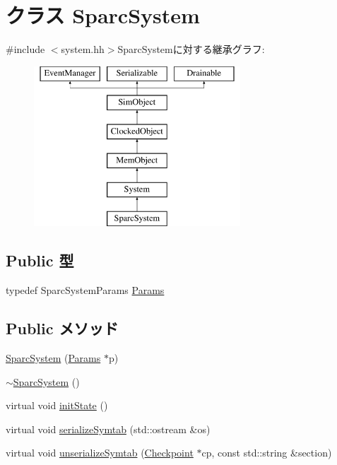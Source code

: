 \hypertarget{classSparcSystem}{
\section{クラス SparcSystem}
\label{classSparcSystem}
}


{\ttfamily \#include $<$system.hh$>$}SparcSystemに対する継承グラフ:\begin{figure}[H]
\begin{center}
\leavevmode
\includegraphics[height=6cm]{classSparcSystem}
\end{center}
\end{figure}
\subsection*{Public 型}
\begin{DoxyCompactItemize}
\item 
typedef SparcSystemParams \hyperlink{classSparcSystem_ad1d7d4179ae16224e8ae3360e3e676b8}{Params}
\end{DoxyCompactItemize}
\subsection*{Public メソッド}
\begin{DoxyCompactItemize}
\item 
\hyperlink{classSparcSystem_aaedf354aedeab4df3588563074335ab9}{SparcSystem} (\hyperlink{classSparcSystem_ad1d7d4179ae16224e8ae3360e3e676b8}{Params} $\ast$p)
\item 
\hyperlink{classSparcSystem_aa7d91656538eac7a14b2aa0475059070}{$\sim$SparcSystem} ()
\item 
virtual void \hyperlink{classSparcSystem_a3c34ea9b29f410748d4435a667484924}{initState} ()
\item 
virtual void \hyperlink{classSparcSystem_a4a3f2000b7188750d8fc90aa204fbfd9}{serializeSymtab} (std::ostream \&os)
\item 
virtual void \hyperlink{classSparcSystem_a183b92b9eac0994f5d446702e995132a}{unserializeSymtab} (\hyperlink{classCheckpoint}{Checkpoint} $\ast$cp, const std::string \&section)
\end{DoxyCompactItemize}
